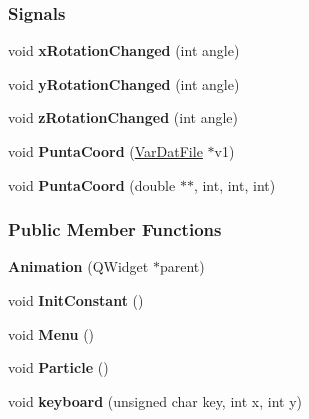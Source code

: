 \subsubsection*{Signals}
\begin{DoxyCompactItemize}
\item 
void {\bfseries x\+Rotation\+Changed} (int angle)\hypertarget{classAnimation_a3ee26aac8a2fcea79a6b38dd7a4cba61}{}\label{classAnimation_a3ee26aac8a2fcea79a6b38dd7a4cba61}

\item 
void {\bfseries y\+Rotation\+Changed} (int angle)\hypertarget{classAnimation_a4760c62adb71794ef669f948eee3c604}{}\label{classAnimation_a4760c62adb71794ef669f948eee3c604}

\item 
void {\bfseries z\+Rotation\+Changed} (int angle)\hypertarget{classAnimation_aa8aec849822061b211a8e67691e0ae99}{}\label{classAnimation_aa8aec849822061b211a8e67691e0ae99}

\item 
void {\bfseries Punta\+Coord} (\hyperlink{classVarDatFile}{Var\+Dat\+File} $\ast$v1)\hypertarget{classAnimation_ae1a9c67660ed6bcfb9839b0045d0263e}{}\label{classAnimation_ae1a9c67660ed6bcfb9839b0045d0263e}

\item 
void {\bfseries Punta\+Coord} (double $\ast$$\ast$, int, int, int)\hypertarget{classAnimation_acbc1cbd5edc8e0a08391a999add774e3}{}\label{classAnimation_acbc1cbd5edc8e0a08391a999add774e3}

\end{DoxyCompactItemize}
\subsubsection*{Public Member Functions}
\begin{DoxyCompactItemize}
\item 
{\bfseries Animation} (Q\+Widget $\ast$parent)\hypertarget{classAnimation_afa9802d69e8367d4b6677a508aa2e2a3}{}\label{classAnimation_afa9802d69e8367d4b6677a508aa2e2a3}

\item 
void {\bfseries Init\+Constant} ()\hypertarget{classAnimation_ac0790850f6751e5fe0f47d16d7f67255}{}\label{classAnimation_ac0790850f6751e5fe0f47d16d7f67255}

\item 
void {\bfseries Menu} ()\hypertarget{classAnimation_afdf1ca9e7afc3e7ec41b47fea4b3d80d}{}\label{classAnimation_afdf1ca9e7afc3e7ec41b47fea4b3d80d}

\item 
void {\bfseries Particle} ()\hypertarget{classAnimation_abd86c6f19dd760d1ed1dce36d290582d}{}\label{classAnimation_abd86c6f19dd760d1ed1dce36d290582d}

\item 
void {\bfseries keyboard} (unsigned char key, int x, int y)\hypertarget{classAnimation_aef7ba2f69afb2d954545f64c7fe24b14}{}\label{classAnimation_aef7ba2f69afb2d954545f64c7fe24b14}

\end{DoxyCompactItemize}
